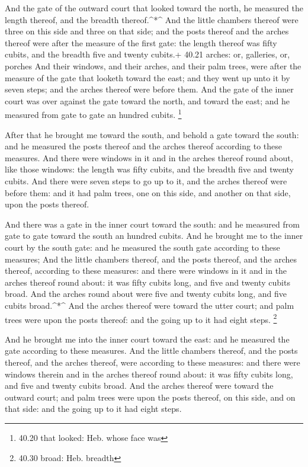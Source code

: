  And the gate of the outward court that looked toward the
north, he measured the length thereof, and the breadth thereof.\^{}*\^{}
 And the little chambers thereof were three on this side
and three on that side; and the posts thereof and the arches thereof
were after the measure of the first gate: the length thereof was fifty
cubits, and the breadth five and twenty cubits.+ 40.21 arches: or,
galleries, or, porches  And their windows, and their
arches, and their palm trees, were after the measure of the gate that
looketh toward the east; and they went up unto it by seven steps; and
the arches thereof were before them.  And the gate of the
inner court was over against the gate toward the north, and toward the
east; and he measured from gate to gate an hundred cubits. \footnote{40.20
  that looked: Heb. whose face was}

 After that he brought me toward the south, and behold a
gate toward the south: and he measured the posts thereof and the arches
thereof according to these measures.  And there were
windows in it and in the arches thereof round about, like those windows:
the length was fifty cubits, and the breadth five and twenty cubits.
 And there were seven steps to go up to it, and the arches
thereof were before them: and it had palm trees, one on this side, and
another on that side, upon the posts thereof.

 And there was a gate in the inner court toward the south:
and he measured from gate to gate toward the south an hundred cubits.
 And he brought me to the inner court by the south gate:
and he measured the south gate according to these measures;
 And the little chambers thereof, and the posts thereof,
and the arches thereof, according to these measures: and there were
windows in it and in the arches thereof round about: it was fifty cubits
long, and five and twenty cubits broad.  And the arches
round about were five and twenty cubits long, and five cubits
broad.\^{}*\^{}  And the arches thereof were toward the
utter court; and palm trees were upon the posts thereof: and the going
up to it had eight steps. \footnote{40.30 broad: Heb. breadth}

 And he brought me into the inner court toward the east:
and he measured the gate according to these measures.  And
the little chambers thereof, and the posts thereof, and the arches
thereof, were according to these measures: and there were windows
therein and in the arches thereof round about: it was fifty cubits long,
and five and twenty cubits broad.  And the arches thereof
were toward the outward court; and palm trees were upon the posts
thereof, on this side, and on that side: and the going up to it had
eight steps.

